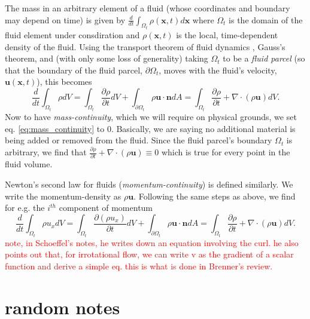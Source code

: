 \documentclass[rmp,aps,nofootinbib,superscriptaddress,floatfix]{revtex4-2}
\begin{document}
The mass in an arbitrary element of a fluid (whose coordinates and boundary may depend on time) is given by  $\frac{d}{dt} \int_{\Omega_t} \rho(\bm{x},t) d\bm{x}$ where $\Omega_t$ is the domain of the fluid element under consdiration and $\rho(\bm{x},t)$ is the local, time-dependent density of the fluid. Using the transport theorem of fluid dynamics \cite{mcdonough2009lectures}, Gauss's theorem, and (with only some loss of generality) taking $\Omega_t$ to be a \emph{fluid parcel} (so that the boundary of the fluid parcel, $\partial \Omega_t$, moves with the fluid's velocity, $\bm{u}(\bm{x},t)$), this becomes
\begin{equation}
    \frac{d}{dt} \int_{\Omega_t} \rho dV = \int_{\Omega_t} \frac{\partial \rho}{\partial t} dV+\int_{\partial \Omega_t} \rho \bm{u} \cdot \bm{n} dA = \int_{\Omega_t} \frac{\partial \rho}{\partial t}+\nabla\cdot(\rho \bm{u})dV.
    \label{eq:mass_continuity}
\end{equation}
Now to have \emph{mass-continuity}, which we will require on physical grounds, we set eq. \ref{eq:mass_continuity} to 0. Basically, we are saying no additional material is being added or removed from the fluid. Since the fluid parcel's boundary $\Omega_t$ is arbitrary, we find that $\frac{\partial \rho}{\partial t}+\nabla\cdot(\rho \bm{u})\equiv 0$ which is true for every point in the fluid volume.

Newton's second law for fluids (\emph{momentum-continuity}) is defined similarly. We write the momentum-density as $\rho \bm{u}$. Following the same steps as above, we find for e.g. the $i^{th}$ component of momentum
\begin{equation}
    \frac{d}{dt} \int_{\Omega_t} \rho u_x dV = \int_{\Omega_t} \frac{\partial (\rho u_x)}{\partial t} dV+\int_{\partial \Omega_t} \rho \bm{u} \cdot \bm{n} dA = \int_{\Omega_t} \frac{\partial \rho}{\partial t}+\nabla\cdot(\rho \bm{u})dV.
    \label{eq:mom_continuity}
\end{equation}
\textcolor{red}{note, in Schoeffel's notes, he writes down an equation involving the curl. he also points out that, for irrotational flow, we can write v as the gradient of a scalar function and derive a simple eq. this is what is done in Brenner's review.}



\newpage 

\section{random notes}
\end{document}

